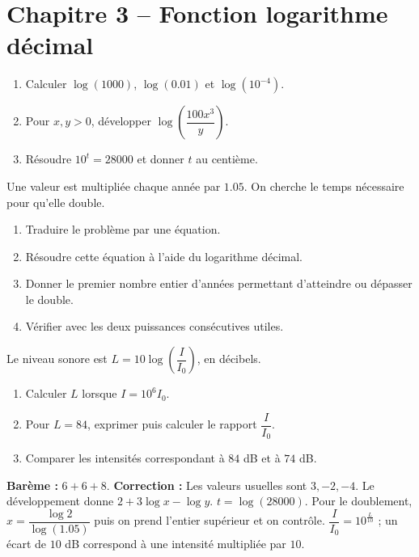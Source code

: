 \section*{Chapitre 3 -- Fonction logarithme décimal}
\begin{exercise}
\begin{enumerate}
\item Calculer $\log(1000)$, $\log(\num{0,01})$ et $\log(10^{-4})$.
\item Pour $x,y>0$, développer $\log\!\left(\dfrac{100x^3}{y} \right)$.
\item Résoudre $10^t=28000$ et donner $t$ au centième.
\end{enumerate}
\end{exercise}
\begin{exercise}
Une valeur est multipliée chaque année par $\num{1,05}$. On cherche le temps nécessaire pour qu'elle double.
\begin{enumerate}
\item Traduire le problème par une équation.
\item Résoudre cette équation à l'aide du logarithme décimal.
\item Donner le premier nombre entier d'années permettant d'atteindre ou dépasser le double.
\item Vérifier avec les deux puissances consécutives utiles.
\end{enumerate}
\end{exercise}
\begin{exercise}
Le niveau sonore est $L=10\log\!\left(\dfrac I{I_0}\right)$, en décibels.
\begin{enumerate}
\item Calculer $L$ lorsque $I=10^6I_0$.
\item Pour $L=84$, exprimer puis calculer le rapport $\dfrac I{I_0}$.
\item Comparer les intensités correspondant à $84$ dB et à $74$ dB.
\end{enumerate}
\end{exercise}
\begin{solution}\textbf{Barème :} $6+6+8$. \textbf{Correction :} Les valeurs usuelles sont $3,-2,-4$. Le développement donne $2+3\log x-\log y$. $t=\log(28000)$. Pour le doublement, $x=\dfrac{\log2}{\log(\num{1,05})}$ puis on prend l'entier supérieur et on contrôle. $\dfrac I{I_0}=10^{\frac L{10}}$ ; un écart de $10$ dB correspond à une intensité multipliée par $10$.\end{solution}

